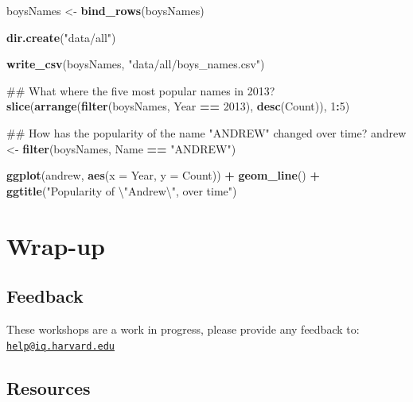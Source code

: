 \documentclass[]{book}
\newenvironment{Shaded}{\begin{snugshade}}{\end{snugshade}}
\newcommand{\KeywordTok}[1]{\textcolor[rgb]{0.13,0.29,0.53}{\textbf{#1}}}
\newcommand{\DataTypeTok}[1]{\textcolor[rgb]{0.13,0.29,0.53}{#1}}
\newcommand{\DecValTok}[1]{\textcolor[rgb]{0.00,0.00,0.81}{#1}}
\newcommand{\CharTok}[1]{\textcolor[rgb]{0.31,0.60,0.02}{#1}}
\newcommand{\StringTok}[1]{\textcolor[rgb]{0.31,0.60,0.02}{#1}}
\newcommand{\OperatorTok}[1]{\textcolor[rgb]{0.81,0.36,0.00}{\textbf{#1}}}
\newcommand{\NormalTok}[1]{#1}
\begin{document}
\begin{Shaded}
\begin{Highlighting}[]
\NormalTok{boysNames <-}\StringTok{ }\KeywordTok{bind_rows}\NormalTok{(boysNames)}

\KeywordTok{dir.create}\NormalTok{(}\StringTok{"data/all"}\NormalTok{)}

\KeywordTok{write_csv}\NormalTok{(boysNames, }\StringTok{"data/all/boys_names.csv"}\NormalTok{)}

\NormalTok{## What where the five most popular names in 2013?}
\KeywordTok{slice}\NormalTok{(}\KeywordTok{arrange}\NormalTok{(}\KeywordTok{filter}\NormalTok{(boysNames, Year }\OperatorTok{==}\StringTok{ }\DecValTok{2013}\NormalTok{),}
              \KeywordTok{desc}\NormalTok{(Count)),}
      \DecValTok{1}\OperatorTok{:}\DecValTok{5}\NormalTok{)}

\NormalTok{## How has the popularity of the name "ANDREW" changed over time?}
\NormalTok{andrew <-}\StringTok{ }\KeywordTok{filter}\NormalTok{(boysNames, Name }\OperatorTok{==}\StringTok{ "ANDREW"}\NormalTok{)}

\KeywordTok{ggplot}\NormalTok{(andrew, }\KeywordTok{aes}\NormalTok{(}\DataTypeTok{x =}\NormalTok{ Year, }\DataTypeTok{y =}\NormalTok{ Count)) }\OperatorTok{+}
\StringTok{    }\KeywordTok{geom_line}\NormalTok{() }\OperatorTok{+}
\StringTok{    }\KeywordTok{ggtitle}\NormalTok{(}\StringTok{"Popularity of }\CharTok{\textbackslash{}"}\StringTok{Andrew}\CharTok{\textbackslash{}"}\StringTok{, over time"}\NormalTok{)}
\end{Highlighting}
\end{Shaded}

\section{Wrap-up}\label{wrap-up-3}

\subsection{Feedback}\label{feedback-3}

These workshops are a work in progress, please provide any feedback to:
\href{mailto:help@iq.harvard.edu}{\nolinkurl{help@iq.harvard.edu}}

\subsection{Resources}\label{resources-3}
\end{document}
